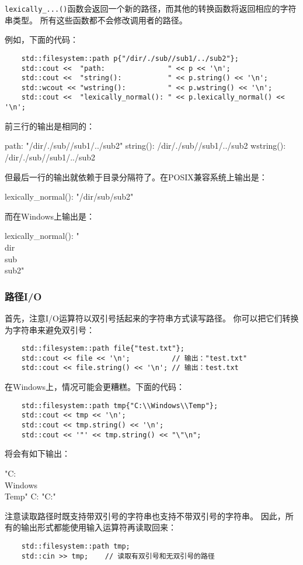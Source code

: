 \texttt{lexically\_...()}函数会返回一个新的路径，而其他的转换函数将返回相应的字符串类型。
所有这些函数都不会修改调用者的路径。

例如，下面的代码：
\begin{lstlisting}
    std::filesystem::path p{"/dir/./sub//sub1/../sub2"};
    std::cout <<  "path:               " << p << '\n';
    std::cout <<  "string():           " << p.string() << '\n';
    std::wcout << "wstring():          " << p.wstring() << '\n';
    std::cout <<  "lexically_normal(): " << p.lexically_normal() << '\n';
\end{lstlisting}
前三行的输出是相同的：
\begin{blacklisting}
    path:               "/dir/./sub//sub1/../sub2"
    string(): /dir/./sub//sub1/../sub2
    wstring(): /dir/./sub//sub1/../sub2
\end{blacklisting}
但最后一行的输出就依赖于目录分隔符了。在POSIX兼容系统上输出是：
\begin{blacklisting}
    lexically_normal(): "/dir/sub/sub2"
\end{blacklisting}
而在Windows上输出是：
\begin{blacklisting}
    lexically_normal(): "\\dir\\sub\\sub2"
\end{blacklisting}

\subsubsection{路径I/O}
首先，注意I/O运算符以双引号括起来的字符串方式读写路径。
你可以把它们转换为字符串来避免双引号：
\begin{lstlisting}
    std::filesystem::path file{"test.txt"};
    std::cout << file << '\n';          // 输出："test.txt"
    std::cout << file.string() << '\n'; // 输出：test.txt
\end{lstlisting}
在Windows上，情况可能会更糟糕。下面的代码：
\begin{lstlisting}
    std::filesystem::path tmp{"C:\\Windows\\Temp"};
    std::cout << tmp << '\n';
    std::cout << tmp.string() << '\n';
    std::cout << '"' << tmp.string() << "\"\n";
\end{lstlisting}
将会有如下输出：
\begin{blacklisting}
    "C:\\Windows\\Temp"
    C:\Windows\Temp
    "C:\Windows\Temp"
\end{blacklisting}
注意读取路径时既支持带双引号的字符串也支持不带双引号的字符串。
因此，所有的输出形式都能使用输入运算符再读取回来：
\begin{lstlisting}
    std::filesystem::path tmp;
    std::cin >> tmp;    // 读取有双引号和无双引号的路径
\end{lstlisting}

